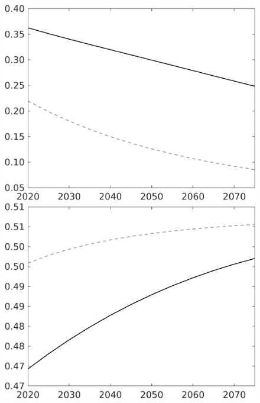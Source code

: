 \documentclass[12pt]{article}
\begin{document}
\begin{figure}
\begin{minipage}[]{0.32\textwidth}
\end{minipage}
\begin{minipage}[]{0.32\textwidth}
\includegraphics[width=1\textwidth]{../../codding_model/own_basedOnFried/optimalPol_010922_revision/figures/all_13Sept22/LevTaufNoTauf_TaulCalib_Equlab_regime0_sg_spillover0_nsk0_xgr0_knspil1_sep1_LFlimit0_emsbase0_countec0_GovRev0_etaa0.79_lgd0.png}
\end{minipage}
\begin{minipage}[]{0.32\textwidth}
\includegraphics[width=1\textwidth]{../../codding_model/own_basedOnFried/optimalPol_010922_revision/figures/all_13Sept22/LevTaufNoTauf_TaulCalib_Equlab_regime0_sn_spillover0_nsk0_xgr0_knspil1_sep1_LFlimit0_emsbase0_countec0_GovRev0_etaa0.79_lgd0.png}

\end{minipage}
\end{figure}
\end{document}
